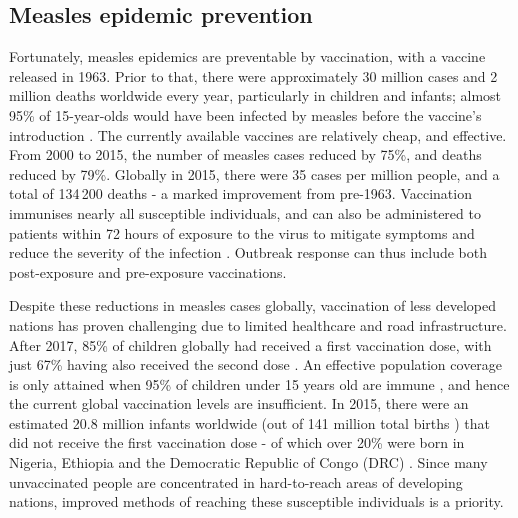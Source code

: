 \subsection{Measles epidemic prevention}
Fortunately, measles epidemics are preventable by vaccination, with a vaccine released in 1963. Prior to that, there were approximately 30 million cases and 2 million deaths worldwide every year, particularly in children and infants; almost 95\% of 15-year-olds would have been infected by measles before the vaccine's introduction \citep{world2017measles}.
The currently available vaccines are relatively cheap, and effective. From 2000 to 2015, the number of measles cases reduced by 75\%, and deaths reduced by 79\%. Globally in 2015, there were 35 cases per million people, and a total of 134\,200 deaths - a marked improvement from pre-1963. Vaccination immunises nearly all susceptible individuals, and can also be administered to patients within 72 hours of exposure to the virus to mitigate symptoms and reduce the severity of the infection \citep{world2017measles}. Outbreak response can thus include both post-exposure and pre-exposure vaccinations.

Despite these reductions in measles cases globally, vaccination of less developed nations has proven challenging due to limited healthcare and road infrastructure. 
After 2017, 85\% of children globally had received a first vaccination dose, with just 67\% having also received the second dose \citep{worldhealthorganization_2018}. 
An effective population coverage is only attained when 95\% of children under 15 years old are immune \cite{msf_2017}, and hence the current global vaccination levels are insufficient.
In 2015, there were an estimated 20.8 million infants worldwide (out of 141 million total births \citep{owidfertilityrate}) that did not receive the first vaccination dose - of which over 20\% were born in Nigeria, Ethiopia and the Democratic Republic of Congo (DRC) \citep{world2017measles}. 
Since many unvaccinated people are concentrated in hard-to-reach areas of developing nations, improved methods of reaching these susceptible individuals is a priority.

